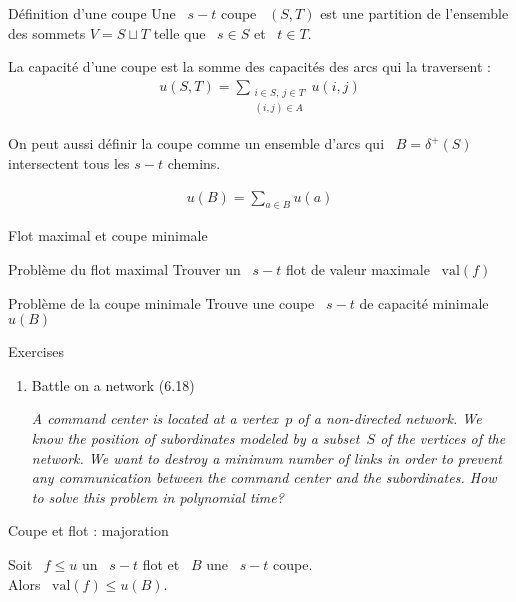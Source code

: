 \documentclass{beamer}
\newcommand{\val}{\mathrm{val}}
\begin{document}
\begin{frame}[t]{Définition d'une coupe} 
  Une ~$s-t$ coupe ~$(S, T)$ est une partition de l'ensemble des sommets $V = S \sqcup T$ telle que ~$s \in S$ et ~$t \in T$.

  \pause
  
  
  La capacité d'une coupe est la somme des capacités des arcs qui la traversent : \pause
  \begin{align*}
    u(S, T) = \sum_{\substack{i \in S,~ j \in T\\(i,j) \in A}} u(i,j)
  \end{align*}

   On peut aussi définir la coupe comme un ensemble d'arcs qui ~$B = \delta^+(S)$ intersectent tous les $s-t$ chemins.
   
  \begin{align*}
  	u(B) = \sum_{a \in B} u(a)
  \end{align*}
\end{frame}

\begin{frame}{Flot maximal et coupe minimale} \pause
  \vfill
  \begin{exampleblock}{Problème du flot maximal}
    Trouver un ~$s-t$ flot de valeur maximale ~$\val(f)$ 
  \end{exampleblock}
  \vfill \pause
  \begin{exampleblock}{Problème de la coupe minimale}
    Trouve une coupe ~$s-t$ de capacité minimale ~$u(B)$
  \end{exampleblock}
  \vfill
\end{frame}

\begin{frame}{Exercises} \pause
  \begin{enumerate}
    \item Battle on a network (6.18)
    
    \textit{\tiny A command center is located at a vertex~$p$ of a non-directed network. We know the position of subordinates modeled by a subset~$S$ of the vertices of the network. We want to destroy a minimum number of links in order to prevent any communication between the command center and the subordinates. How to solve this problem in polynomial time?}
  \end{enumerate}
\end{frame}



\begin{frame}[t]{Coupe et flot : majoration}
  \begin{proposition}[6.3]
    Soit ~$f \leq u$ un ~$s-t$ flot et ~$B$ une ~$s-t$ coupe.\\
    Alors ~$\val(f) \leq u(B)$.
  \end{proposition}
\end{frame}
\end{document}
